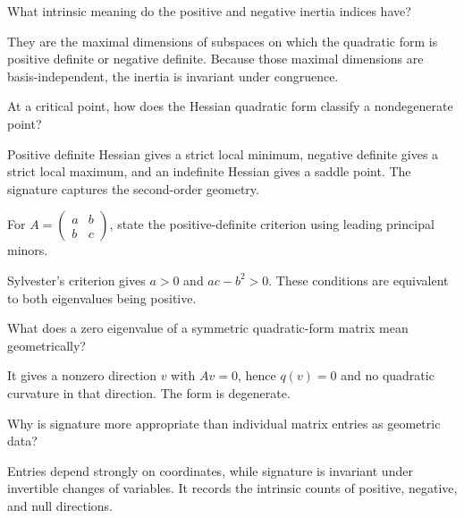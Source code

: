 \begin{problem}\label{prob:i17-problem-08}
What intrinsic meaning do the positive and negative inertia indices have?
\end{problem}
\begin{solution}
They are the maximal dimensions of subspaces on which the quadratic form is positive definite or negative definite. Because those maximal dimensions are basis-independent, the inertia is invariant under congruence.
\end{solution}

\begin{problem}\label{prob:i17-problem-09}
At a critical point, how does the Hessian quadratic form classify a nondegenerate point?
\end{problem}
\begin{solution}
Positive definite Hessian gives a strict local minimum, negative definite gives a strict local maximum, and an indefinite Hessian gives a saddle point. The signature captures the second-order geometry.
\end{solution}

\begin{problem}\label{prob:i17-problem-10}
For $A=\begin{pmatrix}a&b\\b&c\end{pmatrix}$, state the positive-definite criterion using leading principal minors.
\end{problem}
\begin{solution}
Sylvester's criterion gives $a>0$ and $ac-b^2>0$. These conditions are equivalent to both eigenvalues being positive.
\end{solution}

\begin{problem}\label{prob:i17-problem-11}
What does a zero eigenvalue of a symmetric quadratic-form matrix mean geometrically?
\end{problem}
\begin{solution}
It gives a nonzero direction $v$ with $Av=0$, hence $q(v)=0$ and no quadratic curvature in that direction. The form is degenerate.
\end{solution}

\begin{problem}\label{prob:i17-problem-12}
Why is signature more appropriate than individual matrix entries as geometric data?
\end{problem}
\begin{solution}
Entries depend strongly on coordinates, while signature is invariant under invertible changes of variables. It records the intrinsic counts of positive, negative, and null directions.
\end{solution}

